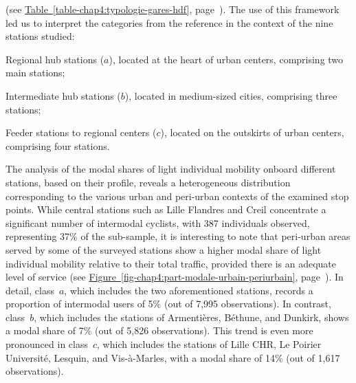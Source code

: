 \begin{refsegment}
{\begin{customitemize}
    \end{customitemize}
} (see \hyperref[table-chap4:typologie-gares-hdf]{Table~\ref{table-chap4:typologie-gares-hdf}}, page~\pageref{table-chap4:typologie-gares-hdf}). The use of this framework led us to interpret the categories from the  reference in the context of the nine stations studied:
    \begin{customitemize}
\item Regional hub stations (\(a\)), located at the heart of urban centers, comprising two main stations;
\item Intermediate hub stations (\(b\)), located in medium-sized cities, comprising three stations;
\item Feeder stations to regional centers (\(c\)), located on the outskirts of urban centers, comprising four stations.
    \end{customitemize}%

The analysis of the modal shares of light individual mobility onboard different stations, based on their profile, reveals a heterogeneous distribution corresponding to the various urban and peri-urban contexts of the examined stop points. While central stations such as Lille Flandres and Creil concentrate a significant number of intermodal cyclists, with 387 individuals observed, representing 37\% of the sub-sample, it is interesting to note that peri-urban areas served by some of the surveyed stations show a higher modal share of light individual mobility relative to their total traffic, provided there is an adequate level of service (see \hyperref[fig-chap4:part-modale-urbain-periurbain]{Figure~\ref{fig-chap4:part-modale-urbain-periurbain}}, page~\pageref{fig-chap4:part-modale-urbain-periurbain}). In detail, class~\(a\), which includes the two aforementioned stations, records a proportion of intermodal users of 5\% (out of 7,995 observations). In contrast, class~\(b\), which includes the stations of Armentières, Béthune, and Dunkirk, shows a modal share of 7\% (out of 5,826 observations). This trend is even more pronounced in class~\(c\), which includes the stations of Lille CHR, Le Poirier Université, Lesquin, and Vis-à-Marles, with a modal share of 14\% (out of 1,617 observations).%


\end{refsegment}
